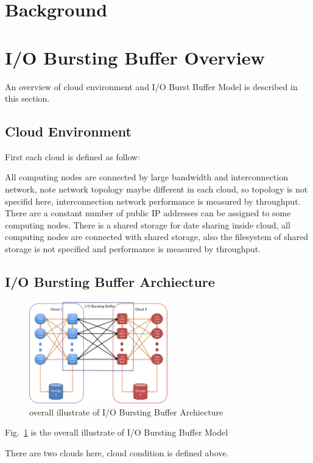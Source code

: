 \documentclass[JIP,draft]{ipsj}
\begin{document}
\section{Background}

\section{I/O Bursting Buffer Overview}
An overview of cloud environment and I/O Burst Buffer Model is described in this section.

\subsection{Cloud Environment}
First each cloud is defined as follow:


All computing nodes are connected by large bandwidth and interconnection network, note network topology maybe different in each cloud, so topology is not specifid here, interconnection network performance is measured by throughput.
There are a constant number of public IP addresses can be assigned to some computing nodes.
There is a shared storage for date sharing inside cloud, all computing nodes are connected with shared storage, also the filesystem of shared storage is not specified and performance is measured by throughput.


\subsection{I/O Bursting Buffer Archiecture}

\begin{figure}[tb]
	\centering
	\includegraphics[width=6cm]{overview}
	\caption{overall illustrate of I/O Bursting Buffer Archiecture}
	\label{overview}
\end{figure}

Fig.~\ref{overview} is the overall illustrate of I/O Bursting Buffer Model

There are two clouds here, cloud condition is defined above.
\end{document}
